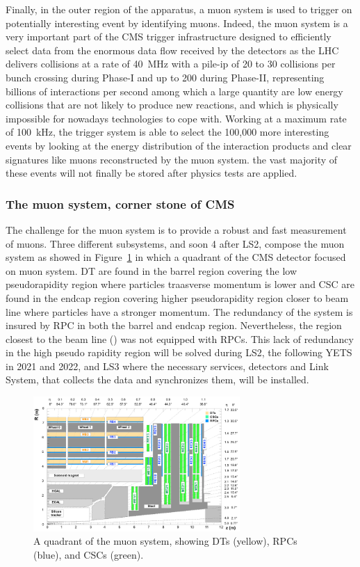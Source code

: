 	Finally, in the outer region of the apparatus, a muon system is used to trigger on potentially interesting event by identifying muons. Indeed, the muon system is a very important part of the CMS trigger infrastructure designed to efficiently select data from the enormous data flow received by the detectors as the LHC delivers collisions at a rate of \SI{40}{MHz} with a pile-ip of 20 to 30 collisions per bunch crossing during Phase-I and up to 200 during Phase-II, representing billions of interactions per second among which a large quantity are low energy collisions that are not likely to produce new reactions, and which is physically impossible for nowadays technologies to cope with. Working at a maximum rate of \SI{100}{kHz}, the trigger system is able to select the 100,000 more interesting events by looking at the energy distribution of the interaction products and clear signatures like muons reconstructed by the muon system. the vast majority of these events will not finally be stored after physics tests are applied.
	
		\subsubsection{The muon system, corner stone of CMS}
		\label{chapt2:sssec:muon}
	
	The challenge for the muon system is to provide a robust and fast measurement of muons. Three different subsystems, and soon 4 after LS2, compose the muon system as showed in Figure~\ref{fig:Quadrant} in which a quadrant of the CMS detector focused on muon system. \acf{DT} are found in the barrel region covering the low pseudorapidity region where particles traasverse momentum is lower and \acf{CSC} are found in the endcap region covering higher pseudorapidity region closer to beam line where particles have a stronger momentum. The redundancy of the system is insured by \acf{RPC} in both the barrel and endcap region. Nevertheless, the region closest to the beam line () was not equipped with RPCs. This lack of redundancy in the high pseudo rapidity region will be solved during LS2, the following \acf{YETS} in 2021 and 2022, and LS3 where the necessary services, detectors and Link System, that collects the data and synchronizes them, will be installed.

	\begin{figure}[H]
		\centering
		\includegraphics[width=0.7\textwidth]{fig/chapt2/Muon_quadrant.png}
		\caption{\label{fig:Quadrant} A quadrant of the muon system, showing DTs (yellow), RPCs (blue), and CSCs (green).}
	\end{figure}

